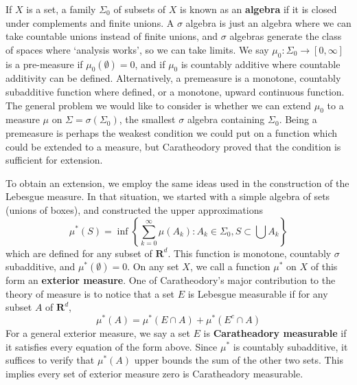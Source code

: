 If $X$ is a set, a family $\Sigma_0$ of subsets of $X$ is known as an {\bf algebra} if it is closed under complements and finite unions. A $\sigma$ algebra is just an algebra where we can take countable unions instead of finite unions, and $\sigma$ algebras generate the class of spaces where `analysis works', so we can take limits. We say $\mu_0: \Sigma_0 \to [0,\infty]$ is a pre-measure if $\mu_0(\emptyset) = 0$, and if $\mu_0$ is countably additive where countable additivity can be defined. Alternatively, a premeasure is a monotone, countably subadditive function where defined, or a monotone, upward continuous function. The general problem we would like to consider is whether we can extend $\mu_0$ to a measure $\mu$ on $\Sigma = \sigma(\Sigma_0)$, the smallest $\sigma$ algebra containing $\Sigma_0$. Being a premeasure is perhaps the weakest condition we could put on a function which could be extended to a measure, but Caratheodory proved that the condition is sufficient for extension.

To obtain an extension, we employ the same ideas used in the construction of the Lebesgue measure. In that situation, we started with a simple algebra of sets (unions of boxes), and constructed the upper approximations
%
\[ \mu^*(S) = \inf \left\{ \sum_{k = 0}^\infty \mu(A_k) : A_k \in \Sigma_0, S \subset \bigcup A_k \right\} \]
%
which are defined for any subset of $\mathbf{R}^d$. This function is monotone, countably $\sigma$ subadditive, and $\mu^*(\emptyset) = 0$. On any set $X$, we call a function $\mu^*$ on $X$ of this form an {\bf exterior measure}. One of Caratheodory's major contribution to the theory of measure is to notice that a set $E$ is Lebesgue measurable if for any subset $A$ of $\mathbf{R}^d$,
%
\[ \mu^*(A) = \mu^*(E \cap A) + \mu^*(E^c \cap A) \]
%
For a general exterior measure, we say a set $E$ is {\bf Caratheadory measurable} if it satisfies every equation of the form above. Since $\mu^*$ is countably subadditive, it suffices to verify that $\mu^*(A)$ upper bounds the sum of the other two sets. This implies every set of exterior measure zero is Caratheadory measurable.

